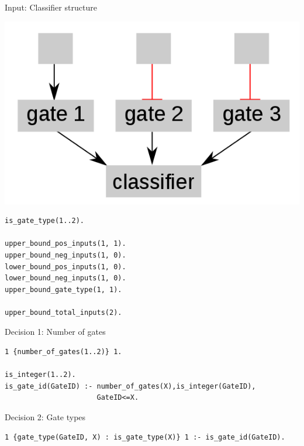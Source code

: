\documentclass[10pt,dvipsnames]{beamer}
\begin{document}
\begin{frame}[fragile]{Input: Classifier structure}
\begin{center}
\includegraphics[scale=0.25]{classifier.png}
\end{center}
\vspace{0.3cm}

\begin{verbatim}
is_gate_type(1..2).
 
upper_bound_pos_inputs(1, 1). 
upper_bound_neg_inputs(1, 0). 
lower_bound_pos_inputs(1, 0). 
lower_bound_neg_inputs(1, 0). 
upper_bound_gate_type(1, 1). 
 
upper_bound_total_inputs(2).
\end{verbatim}

\end{frame}


\begin{frame}[fragile]{Decision 1: Number of gates}
\small
\begin{verbatim}
1 {number_of_gates(1..2)} 1.

is_integer(1..2).
is_gate_id(GateID) :- number_of_gates(X),is_integer(GateID), 
                      GateID<=X.
\end{verbatim}
\end{frame}


\begin{frame}[fragile]{Decision 2: Gate types}
\small
\begin{verbatim}
1 {gate_type(GateID, X) : is_gate_type(X)} 1 :- is_gate_id(GateID).
\end{verbatim}
\end{frame}
\end{document}
